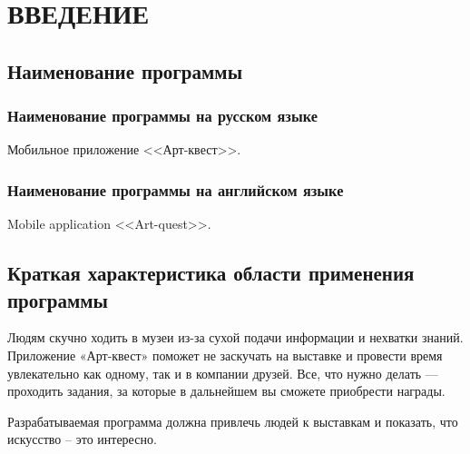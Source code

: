 \pagestyle{fancy}


\section{ВВЕДЕНИЕ}


\subsection{Наименование программы} 
	
\subsubsection{Наименование программы на русском языке}
	
\hspace{10mm}	Мобильное приложение <<Арт-квест>>.
	
\subsubsection{Наименование программы на английском языке}	
	
	\hspace{10mm} Mobile application <<Art-quest>>.
	
\subsection{Краткая характеристика области применения программы}
	
	
\hspace{10mm} Людям скучно ходить в музеи из-за сухой подачи информации и нехватки знаний. Приложение «Арт-квест» поможет не заскучать на выставке и провести время увлекательно как одному, так и в компании друзей. Все, что нужно делать — проходить задания, за которые в дальнейшем вы сможете приобрести награды.

\hspace{10mm} Разрабатываемая программа должна привлечь людей к выставкам и показать, что искусство -- это интересно.